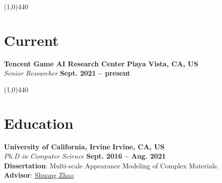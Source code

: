 \documentclass[margin,line]{resume}
\begin{document}
\begin{resume}


    
    \vspace{-5.0mm}
    \line(1,0){440}
    \vspace{-5.0mm}

    \section{\mysidestyle Current}

    \textbf{Tencent Game AI Research Center}       \hfill \textbf{Playa Vista, CA, US}  \\
    \textsl{Senior Researcher} 															\hfill \textbf{Sept. 2021 -- present} 

    \vspace{-5.0mm}
    \line(1,0){440}
    \vspace{-5.0mm}

    \section{\mysidestyle Education}
    \textbf{University of California, Irvine}       \hfill \textbf{Irvine, CA, US}  \\
    \textsl{Ph.D in Computer Science} 															\hfill \textbf{Sept. 2016 -- Aug. 2021} \\
    \textbf{Dissertation}: Multi-scale Appearance Modeling of Complex Materials. \\
    \textbf{Advisor}: \href{https://shuangz.com/}{Shuang Zhao} 


\end{resume}
\end{document}
